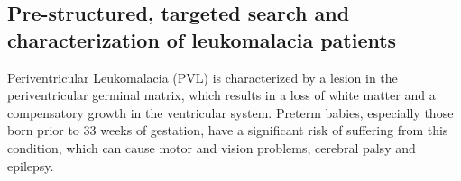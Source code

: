 \documentclass[twocolumn]{svjour3}
\begin{document}
%
%
%
%
%
%
%
  

\subsection{Pre-structured, targeted search and characterization of leukomalacia patients}
\label{sec_pvm_case}
Periventricular Leukomalacia (PVL) is characterized by a lesion in the periventricular germinal matrix, which results in a loss of white matter and a compensatory growth in the ventricular system. Preterm babies, especially those born prior to 33 weeks of gestation, have a significant risk of suffering from this condition, which can cause motor and vision problems, cerebral palsy and epilepsy.    
\end{document}
